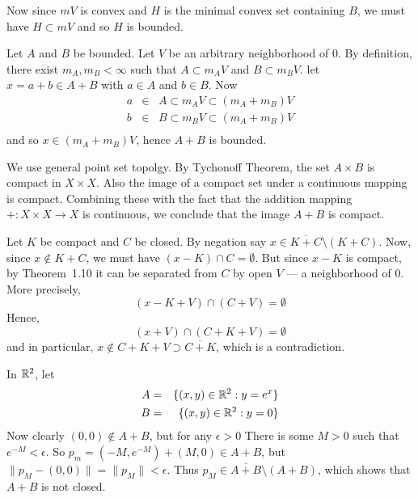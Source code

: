 \begin{enumerate}
\begin{itemize}
   Now since \(mV\) is convex and $H$ is the minimal convex set
   containing $B$, we must have \(H \subset mV\) and so $H$ is bounded.

   Let $A$ and $B$ be bounded. Let $V$ be an arbitrary neighborhood of $0$.
   By definition, there exist \(m_A, m_B < \infty\)
   such that \(A \subset m_A V\) and \(B \subset m_B V\).
   let \(x=a+b\in A+B\) with \(a\in A\) and \(b\in B\).
   Now
   \begin{eqnarray*}
   a &\in& A \subset m_A V \subset (m_A + m_B)V \\
   b &\in& B \subset m_B V \subset (m_A + m_B)V \\
   \end{eqnarray*}
   and so \(x \in  (m_A + m_B)V\), hence \(A+B\) is bounded.

  We use general point set topolgy.
  By Tychonoff Theorem, the set \(A\times B\) is compact in \(X\times X\).
  Also the image of a compact set under a continuous mapping is compact.
  Combining these with the fact that
  the addition mapping \(+: X\times X \rightarrow X\) 
  is continuous, we conclude that
  the image \(A+B\) is compact.
   
   Let $K$ be compact and $C$ be closed.
   By negation say \(x\in \overline{K+C}\setminus(K+C)\).
   Now, since \(x\notin K+C\), we must have \((x-K)\cap C = \emptyset\).
   But since \(x-K\) is compact,
   by Theorem~1.10 it can be separated from $C$ by open $V$ --- 
   a neighborhood of $0$.
   More precisely, 
   \begin{equation*}
   (x-K+V) \cap (C+V) = \emptyset
   \end{equation*}
   Hence,
   \begin{equation*}
   (x+V) \cap (C+K+V) = \emptyset
   \end{equation*}
   and in particular, \(x \notin C+K+V \supset \overline{C+K}\),
   which is a contradiction.
   
   In \(\mathbb{R}^2\), let 
   \begin{eqnarray*}
   A & = & \{(x,y)\in\mathbb{R}^2: y = e^x\} \\
   B & = & \{(x,y)\in\mathbb{R}^2: y = 0\} \\
   \end{eqnarray*}
   Now clearly \((0,0) \notin A+B\), but for any \(\epsilon > 0\)
   There is some \(M > 0\) such that \(e^{-M} < \epsilon\).
   So \(p_m = (-M,e^{-M}) + (M,0) \in A+B\), but 
   \(\|p_M - (0,0)\| = \|p_M\| < \epsilon\). Thus
   \(p_M \in \overline{A+B} \setminus (A+B)\), which shows that \(A+B\) is 
   not closed.


\end{itemize}
\end{enumerate}
